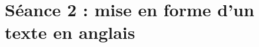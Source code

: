 \phantom{rien} 


\vfill

\begin{center}\label{modelePage5e1}\end{center}

\vfill

\phantom{rien} 




%
%
%
%


\newpage

\section{Séance 2 : mise en forme d'un texte en anglais}\label{ficheTexte5e2}



